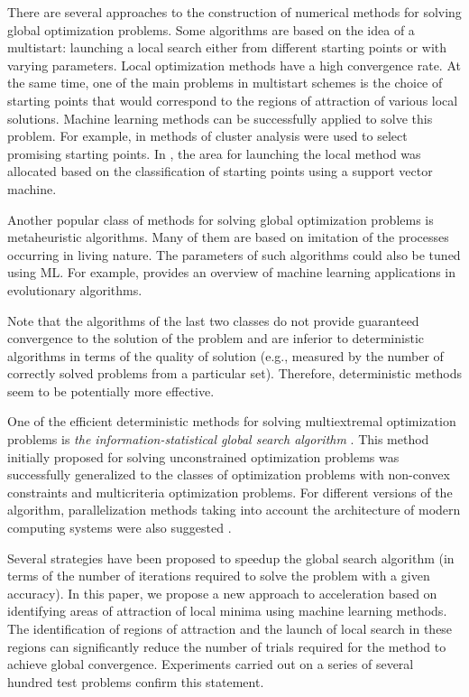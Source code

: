 \documentclass[entropy,article,submit,moreauthors,pdftex]{Definitions/mdpi}
\begin{document}
There are several approaches to the construction of numerical methods for solving global optimization problems. 
Some algorithms are based on the idea of a multistart: launching a local search either from different starting points or with varying parameters. Local optimization methods have a high convergence rate. At the same time, one of the main problems in multistart schemes is the choice of starting points that would correspond to the regions of attraction of various local solutions. 
Machine learning methods can be successfully applied to solve this problem.  
For example, in \cite{RinnooyKan1987} methods of cluster analysis were used to select promising starting points.
In \cite{Cassioli2012}, the area for launching the local method was allocated based on the classification of starting points using a support vector machine.

Another popular class of methods for solving global optimization problems is metaheuristic algorithms. 
Many of them are based on imitation of the processes occurring in living nature. The parameters of such algorithms could also be tuned using ML. For example, \cite{Jin2005} provides an overview of machine learning applications in evolutionary algorithms.

Note that the algorithms of the last two classes do not provide guaranteed convergence to the solution of the problem and are inferior to deterministic algorithms in terms of the quality of solution \cite{Kvasov2018,Sergeyev2018} (e.g., measured by the number of correctly solved problems from a particular set). Therefore, deterministic methods seem to be potentially more effective.


One of the efficient deterministic methods for solving multiextremal optimization problems is \textit{the information-statistical global search algorithm} \cite{Strongin2000}. This method initially proposed for solving unconstrained optimization problems was successfully generalized to the classes of optimization problems with non-convex constraints and multicriteria optimization problems. For different versions of the algorithm, parallelization methods taking into account the architecture of modern computing systems were also suggested \cite{Barkalov2016,globalizerSystem,Strongin2018}.


Several strategies have been proposed to speedup the global search algorithm (in terms of the number of iterations required to solve the problem with a given accuracy). In this paper, we propose a new approach to acceleration based on identifying areas of attraction of local minima using machine learning methods. The identification of regions of attraction and the launch of local search in these regions can significantly reduce the number of trials required for the method to achieve global convergence. Experiments carried out on a series of several hundred test problems confirm this statement. 
\end{document}
